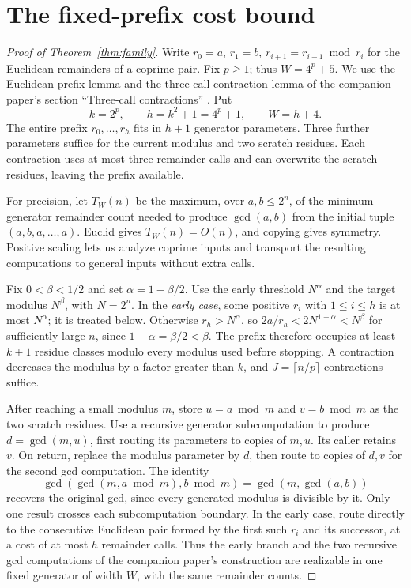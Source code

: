 \documentclass[11pt]{article}
\begin{document}
\section{The fixed-prefix cost bound}

\begin{proof}[Proof of Theorem~\ref{thm:family}]
Write $r_0=a$, $r_1=b$, $r_{i+1}=r_{i-1}\bmod r_i$ for the Euclidean
remainders of a coprime pair.
Fix $p\geq1$; thus $W=4^p+5$.
We use the Euclidean-prefix lemma and the three-call contraction lemma of
the companion paper's section ``Three-call contractions'' \cite{companion}.
Put
\[
k=2^p,\qquad h=k^2+1=4^p+1,\qquad W=h+4.
\]
The entire prefix $r_0,\ldots,r_h$ fits in $h+1$ generator parameters.
Three further parameters suffice for the current modulus and two scratch
residues. Each contraction uses at most three remainder calls and can
overwrite the scratch residues, leaving the prefix available.

For precision, let $T_W(n)$ be the maximum, over $a,b\leq2^n$, of the minimum
generator remainder count needed to produce $\gcd(a,b)$ from the initial
tuple $(a,b,a,\ldots,a)$. Euclid gives $T_W(n)=O(n)$, and copying gives symmetry.
Positive scaling lets us analyze coprime inputs and transport the resulting
computations to general inputs without extra calls.

Fix $0<\beta<1/2$ and set $\alpha=1-\beta/2$.
Use the early threshold $N^\alpha$ and the target modulus $N^\beta$, with
$N=2^n$. In the \emph{early case}, some positive $r_i$ with $1\leq i\leq h$
is at most $N^\alpha$; it is treated below. Otherwise $r_h>N^\alpha$, so
$2a/r_h<2N^{1-\alpha}<N^\beta$ for sufficiently large $n$, since
$1-\alpha=\beta/2<\beta$.
The prefix therefore occupies at least $k+1$ residue classes modulo every
modulus used before stopping. A contraction decreases the modulus by a factor
greater than $k$, and $J=\lceil n/p\rceil$ contractions suffice.

After reaching a small modulus $m$, store $u=a\bmod m$ and $v=b\bmod m$
as the two scratch residues. Use a recursive generator subcomputation
to produce $d=\gcd(m,u)$, first routing its parameters to copies of $m,u$.
Its caller retains $v$. On return, replace the modulus parameter by $d$,
then route to copies of $d,v$ for the second gcd computation.
The identity
\[
\gcd(\gcd(m,a\bmod m),b\bmod m)=\gcd(m,\gcd(a,b))
\]
recovers the original gcd, since every generated modulus is divisible by it.
Only one result crosses each subcomputation boundary.
In the early case, route directly to the consecutive Euclidean pair formed by
the first such $r_i$ and its successor, at a cost of at most $h$ remainder
calls.
Thus the early branch and the two recursive gcd computations of the
companion paper's construction are realizable in one fixed generator of width
$W$, with the same remainder counts.


\end{proof}
\end{document}
